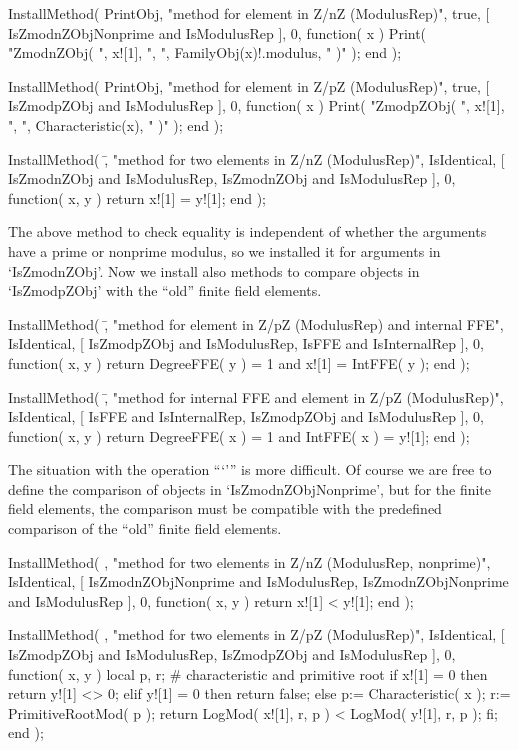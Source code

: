 \begintt
    InstallMethod( PrintObj,
        "method for element in Z/nZ (ModulusRep)",
        true,
        [ IsZmodnZObjNonprime and IsModulusRep ], 0,
        function( x )
        Print( "ZmodnZObj( ", x![1], ", ", FamilyObj(x)!.modulus, " )" );
        end );

    InstallMethod( PrintObj,
        "method for element in Z/pZ (ModulusRep)",
        true,
        [ IsZmodpZObj and IsModulusRep ], 0,
        function( x )
        Print( "ZmodpZObj( ", x![1], ", ", Characteristic(x), " )" );
        end );

    InstallMethod( \=,
        "method for two elements in Z/nZ (ModulusRep)",
        IsIdentical,
        [ IsZmodnZObj and IsModulusRep,
          IsZmodnZObj and IsModulusRep ], 0,
        function( x, y ) return x![1] = y![1]; end );
\endtt

The above method to check equality is independent of whether the
arguments have a prime or nonprime modulus,
so we installed it for arguments in `IsZmodnZObj'.
Now we install also methods to compare objects in `IsZmodpZObj'
with the ``old'' finite field elements.

\begintt
    InstallMethod( \=,
        "method for element in Z/pZ (ModulusRep) and internal FFE",
        IsIdentical,
        [ IsZmodpZObj and IsModulusRep, IsFFE and IsInternalRep ], 0,
        function( x, y )
        return DegreeFFE( y ) = 1 and x![1] = IntFFE( y );
        end );

    InstallMethod( \=,
        "method for internal FFE and element in Z/pZ (ModulusRep)",
        IsIdentical,
        [ IsFFE and IsInternalRep, IsZmodpZObj and IsModulusRep ], 0,
        function( x, y )
        return DegreeFFE( x ) = 1 and IntFFE( x ) = y![1];
        end );
\endtt

The situation with the operation ```\<''' is more difficult.
Of course we are free to define the comparison of objects in
`IsZmodnZObjNonprime',
but for the finite field elements, the comparison must be compatible
with the predefined comparison of the ``old'' finite field elements.

\begintt
    InstallMethod( \<,
        "method for two elements in Z/nZ (ModulusRep, nonprime)",
        IsIdentical,
        [ IsZmodnZObjNonprime and IsModulusRep,
          IsZmodnZObjNonprime and IsModulusRep ], 0,
        function( x, y ) return x![1] < y![1]; end );

    InstallMethod( \<,
        "method for two elements in Z/pZ (ModulusRep)",
        IsIdentical,
        [ IsZmodpZObj and IsModulusRep,
          IsZmodpZObj and IsModulusRep ], 0,
        function( x, y )
        local p, r;      # characteristic and primitive root
        if x![1] = 0 then
          return y![1] <> 0;
        elif y![1] = 0 then
          return false;
        else
          p:= Characteristic( x );
          r:= PrimitiveRootMod( p );
          return LogMod( x![1], r, p ) < LogMod( y![1], r, p );
        fi;
        end );

